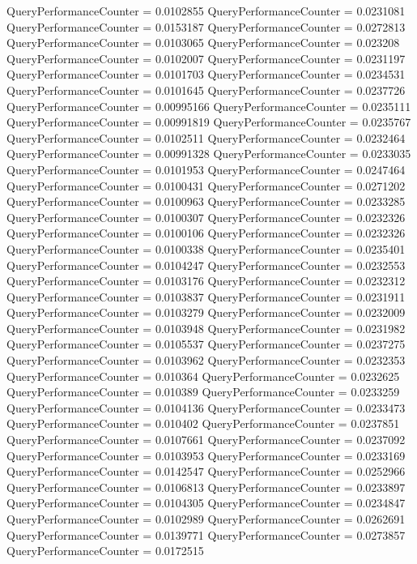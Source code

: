 \documentclass[9pt]{article}
\theoremstyle{plain}
\theoremstyle{definition}
\theoremstyle{remark}
\numberwithin{equation}{section}
\begin{document}
QueryPerformanceCounter  =  0.0102855
QueryPerformanceCounter  =  0.0231081
QueryPerformanceCounter  =  0.0153187
QueryPerformanceCounter  =  0.0272813
QueryPerformanceCounter  =  0.0103065
QueryPerformanceCounter  =  0.023208
QueryPerformanceCounter  =  0.0102007
QueryPerformanceCounter  =  0.0231197
QueryPerformanceCounter  =  0.0101703
QueryPerformanceCounter  =  0.0234531
QueryPerformanceCounter  =  0.0101645
QueryPerformanceCounter  =  0.0237726
QueryPerformanceCounter  =  0.00995166
QueryPerformanceCounter  =  0.0235111
QueryPerformanceCounter  =  0.00991819
QueryPerformanceCounter  =  0.0235767
QueryPerformanceCounter  =  0.0102511
QueryPerformanceCounter  =  0.0232464
QueryPerformanceCounter  =  0.00991328
QueryPerformanceCounter  =  0.0233035
QueryPerformanceCounter  =  0.0101953
QueryPerformanceCounter  =  0.0247464
QueryPerformanceCounter  =  0.0100431
QueryPerformanceCounter  =  0.0271202
QueryPerformanceCounter  =  0.0100963
QueryPerformanceCounter  =  0.0233285
QueryPerformanceCounter  =  0.0100307
QueryPerformanceCounter  =  0.0232326
QueryPerformanceCounter  =  0.0100106
QueryPerformanceCounter  =  0.0232326
QueryPerformanceCounter  =  0.0100338
QueryPerformanceCounter  =  0.0235401
QueryPerformanceCounter  =  0.0104247
QueryPerformanceCounter  =  0.0232553
QueryPerformanceCounter  =  0.0103176
QueryPerformanceCounter  =  0.0232312
QueryPerformanceCounter  =  0.0103837
QueryPerformanceCounter  =  0.0231911
QueryPerformanceCounter  =  0.0103279
QueryPerformanceCounter  =  0.0232009
QueryPerformanceCounter  =  0.0103948
QueryPerformanceCounter  =  0.0231982
QueryPerformanceCounter  =  0.0105537
QueryPerformanceCounter  =  0.0237275
QueryPerformanceCounter  =  0.0103962
QueryPerformanceCounter  =  0.0232353
QueryPerformanceCounter  =  0.010364
QueryPerformanceCounter  =  0.0232625
QueryPerformanceCounter  =  0.010389
QueryPerformanceCounter  =  0.0233259
QueryPerformanceCounter  =  0.0104136
QueryPerformanceCounter  =  0.0233473
QueryPerformanceCounter  =  0.010402
QueryPerformanceCounter  =  0.0237851
QueryPerformanceCounter  =  0.0107661
QueryPerformanceCounter  =  0.0237092
QueryPerformanceCounter  =  0.0103953
QueryPerformanceCounter  =  0.0233169
QueryPerformanceCounter  =  0.0142547
QueryPerformanceCounter  =  0.0252966
QueryPerformanceCounter  =  0.0106813
QueryPerformanceCounter  =  0.0233897
QueryPerformanceCounter  =  0.0104305
QueryPerformanceCounter  =  0.0234847
QueryPerformanceCounter  =  0.0102989
QueryPerformanceCounter  =  0.0262691
QueryPerformanceCounter  =  0.0139771
QueryPerformanceCounter  =  0.0273857
QueryPerformanceCounter  =  0.0172515
\end{document}
